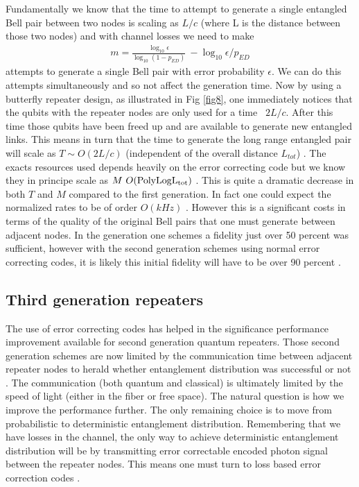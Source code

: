 \documentclass[twocolumn, aps, rmp, amsmath, amssymb, nofootinbib, superscriptaddress, longbibliography, floatfix, table-of-contents, eqsecnum]{revtex4-1}
\begin{document}
Fundamentally we know that the time to attempt to generate a single entangled Bell pair between two nodes is scaling as $L/c$ (where L is the distance between those two nodes) and with channel losses we need to make
\begin{align}
m=\frac{\log_{10} \epsilon}{\log_{10} (1-p_{ED})} ~ - \log_{10} \epsilon / p_{ED}
\end{align}
attempts to generate a single Bell pair with error probability $\epsilon$. We can do this attempts simultaneously and so not affect the generation time. Now by using a butterfly repeater design,  as illustrated in Fig \ref{fig8}, one immediately notices that the qubits with the repeater nodes are only used for a time ~$2 L/c$. After this time those qubits have been freed up and are available to generate new entangled links. This means in turn that the time to generate the long range entangled pair will scale as $T\sim O(2 L/c)$ (independent of the overall distance $L_{tot}$) \cite{jiang09,munro10,Muralidharan2016}. The exacts resources used depends heavily on the error correcting code but we know they in principe scale as $M~ O(\rm {PolyLog} L_{tot})$ \cite{Muralidharan2016}. This is quite a dramatic decrease in both $T$ and $M$ compared to the first generation. In fact one could expect the normalized rates to be of order $O(kHz)$ \cite{munro10}. However this is a significant costs in terms of the quality of the original Bell pairs that one must generate between adjacent nodes. In the generation one schemes a fidelity just over 50 percent was sufficient, however with the second generation schemes using normal error correcting codes, it is likely this initial fidelity will have to be over 90 percent  \cite{jiang09,munro10}. 

\subsection{Third generation repeaters}

The use of error correcting codes has helped in the significance performance improvement available for second generation quantum repeaters. Those second generation schemes are now limited by the communication time between adjacent repeater nodes to herald whether entanglement distribution was successful or not \cite{munro10,munro12}. The communication (both quantum and classical) is ultimately limited by the speed of light (either in the fiber or free space). The natural question is how we improve the performance further. The only remaining choice is to move from probabilistic to deterministic entanglement distribution. Remembering that we have losses in the channel, the only way to achieve deterministic entanglement distribution will be by transmitting error correctable encoded photon signal between the repeater nodes. This means one must turn to loss based error correction codes \cite{ralph05,munro12,Fowler10,ATL13,MKLLJ14}.  
\end{document}
